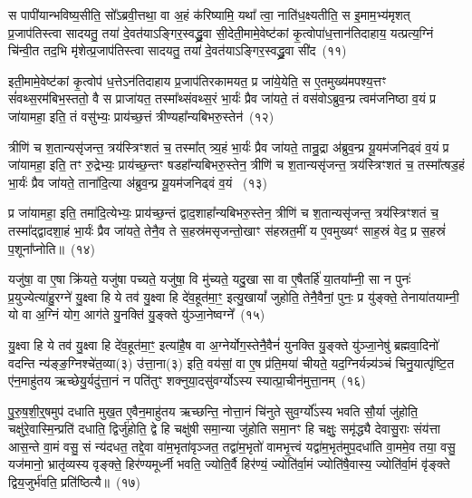 स पापी॑यान्भविष्य॒सीति॒ सो᳚\-ऽब्रवी॒त्तथा॒ वा अ॒हं क॑रिष्यामि॒ यथा᳚ त्वा॒ नाति॑ध॒क्ष्यतीति॒ स इ॒माम॒भ्य॑मृशत् प्र॒जा\-प॑तिस्त्वा सादयतु॒ तया॑ दे॒वत॑या\-ऽ\-ङ्गिर॒स्वद्ध्रु॒वा सी॒देती॒मामे॒वेष्ट॑कां कृ॒त्वोपा॑ध॒त्तान॑तिदाहाय॒ यत्प्रत्य॒ग्निं चि॑न्वी॒त तद॒भि मृ॑शेत्प्र॒जा\-प॑तिस्त्वा सादयतु॒ तया॑ दे॒वत॑या\-ऽ\-ङ्गिर॒स्वद्ध्रु॒वा सी॑द~(११)

इती॒मामे॒वेष्ट॑कां कृ॒त्वोप॑ ध॒त्ते\-ऽन॑तिदाहाय प्र॒जा\-प॑तिरकामयत॒ प्र जा॑ये॒येति॒ स ए॒तमुख्य॑मपश्य॒त्तꣳ सं॑वथ्स॒रम॑बिभ॒स्ततो॒ वै स प्राजा॑यत॒ तस्मा᳚थ्संवथ्स॒रं भा॒र्यः॑ प्रैव जा॑यते॒ तं वस॑वो\-ऽब्रुव॒न्प्र त्वम॑जनिष्ठा व॒यं प्र जा॑यामहा॒ इति॒ तं वसु॑भ्यः॒ प्राय॑च्छ॒त्तं त्रीण्यहा᳚न्यबिभरु॒स्तेन॑~(१२)

त्रीणि॑ च श॒तान्यसृ॑जन्त॒ त्रय॑स्त्रिꣳशतं च॒ तस्मा᳚त् त्र्य॒हं भा॒र्यः॑ प्रैव जा॑यते॒ तान्रु॒द्रा अ॑ब्रुव॒न्प्र यू॒यम॑जनिढ्वं व॒यं प्र जा॑यामहा॒ इति॒ तꣳ रु॒द्रेभ्यः॒ प्राय॑च्छ॒न्तꣳ षडहा᳚न्यबिभरु॒स्तेन॒ त्रीणि॑ च श॒तान्यसृ॑जन्त॒ त्रय॑स्त्रिꣳशतं च॒ तस्मा᳚त्षड॒हं भा॒र्यः॑ प्रैव जा॑यते॒ ताना॑दि॒त्या अ॑ब्रुव॒न्प्र यू॒यम॑जनिढ्वं व॒यं ~(१३)

प्र जा॑यामहा॒ इति॒ तमा॑दि॒त्येभ्यः॒ प्राय॑च्छ॒न्तं द्वाद॒शाहा᳚न्यबिभरु॒स्तेन॒ त्रीणि॑ च श॒तान्यसृ॑जन्त॒ त्रय॑स्त्रिꣳशतं च॒ तस्मा᳚द्द्वादशा॒हं भा॒र्यः॑ प्रैव जा॑यते॒ तेनै॒व ते स॒हस्र॑मसृजन्तो॒खाꣳ स॑हस्रत॒मीं य ए॒वमुख्यꣳ॑ साह॒स्रं वेद॒ प्र स॒हस्रं॑ प॒शूना᳚प्नोति॥~(१४)

{\anuvakamend[{अ॒ग्नि॒वान्प॑शु॒मान॑सा॒नीति॒ वा अ॒ग्निर्ध॑विष्ये मृशेत्प्र॒जा\-प॑तिस्त्वा सादयतु॒ तया॑ दे॒वत॑या\-ऽ\-ङ्गिर॒स्वद्ध्रु॒वा सी॑द॒ तेन॒ ताना॑दि॒त्या अ॑ब्रुव॒न्प्र यू॒यम॑जनिढ्वं व॒यञ्च॑त्वारि॒ꣳ॒शच्च॑}]}%

यजु॑षा॒ वा ए॒षा क्रि॑यते॒ यजु॑षा पच्यते॒ यजु॑षा॒ वि मु॑च्यते॒ यदु॒खा सा वा ए॒षैतर्\mbox{}हि॑ या॒तया᳚म्नी॒ सा न पुनः॑ प्र॒युज्येत्या॑हु॒रग्ने॑ यु॒क्ष्वा हि ये तव॑ यु॒क्ष्वा हि दे॑व॒हूत॑मा॒ꣳ॒ इत्यु॒खायां᳚ जुहोति॒ तेनै॒वैनां॒ पुनः॒ प्र यु॑ङ्क्ते॒ तेनाया॑तयाम्नी॒ यो वा अ॒ग्निं योग॒ आग॑ते यु॒नक्ति॑ यु॒ङ्क्ते यु॑ञ्जा॒नेष्वग्ने᳚~(१५)

यु॒क्ष्वा हि ये तव॑ यु॒क्ष्वा हि दे॑व॒हूत॑मा॒ꣳ॒ इत्या॑है॒ष वा अ॒ग्नेर्योग॒स्तेनै॒वैनं॑ युनक्ति यु॒ङ्क्ते यु॑ञ्जा॒नेषु॑ ब्रह्मवा॒दिनो॑ वदन्ति न्य॑ङ्ङ॒ग्निश्चे॑त॒व्या(३) उ॑त्ता॒ना(३) इति॒ वय॑सां॒ वा ए॒ष प्र॑ति॒मया॑ चीयते॒ यद॒ग्निर्यन्न्य॑ञ्चं चिनु॒यात्पृ॑ष्टि॒त ए॑न॒माहु॑तय ऋच्छेयु॒र्यदु॑त्ता॒नं न पति॑तुꣳ शक्नुया॒दसु॑वर्ग्यो\-ऽस्य स्यात्प्रा॒चीन॑मुत्ता॒नम्~(१६)

पु॒रु॒ष॒शी॒र्॒\mbox{}षमुप॑ दधाति मुख॒त ए॒वैन॒माहु॑तय ऋच्छन्ति॒ नोत्ता॒नं चि॑नुते सुव॒र्ग्यो᳚\-ऽस्य भवति सौ॒र्या जु॑होति॒ चक्षु॑रे॒वास्मि॒न्प्रति॑ दधाति॒ द्विर्जु॑होति॒ द्वे हि चक्षु॑षी समा॒न्या जु॑होति समा॒नꣳ हि चक्षुः॒ समृ॑द्ध्यै देवासु॒राः संय॑त्ता आस॒न्ते वा॒मं वसु॒ सं न्य॑दधत॒ तद्दे॒वा वा॑म॒भृता॑वृञ्जत॒ तद्वा॑म॒भृतो॑ वामभृ॒त्त्वं यद्वा॑म॒भृत॑मुप॒दधा॑ति वा॒ममे॒व तया॒ वसु॒ यज॑मानो॒ भ्रातृ॑व्यस्य वृङ्क्ते॒ हिर॑ण्यमूर्ध्नी भवति॒ ज्योति॒र्वै हिर॑ण्यं॒ ज्योति॑र्वा॒मं ज्योति॑षै॒वास्य॒ ज्योति॑र्वा॒मं वृ॑ङ्क्ते द्विय॒जुर्भ॑वति॒ प्रति॑ष्ठित्यै॥~(१७)

